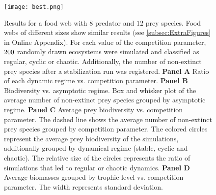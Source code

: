 \begin{figure}
	\begin{center}
		\texttt{[image: best.png]}
	\end{center}
	\caption{Results for a food web with $8$ predator and $12$ prey species. Food webs of different sizes show similar results (see \ref{subsec:ExtraFigures} in Online Appendix). For each value of the competition parameter, $200$ randomly drawn ecosystems were simulated and classified as regular, cyclic or chaotic. Additionally, the number of non-extinct prey species after a stabilization run was registered. \textbf{Panel A} Ratio of each dynamic regime vs. competition parameter. \textbf{Panel B} Biodiversity vs. asymptotic regime. Box and whisker plot of the average number of non-extinct prey species grouped by asymptotic regime. \textbf{Panel C} Average prey biodiversity vs. competition parameter. The dashed line shows the average number of non-extinct prey species grouped by competition parameter. The colored circles represent the average prey biodiversity of the simulations, additionally grouped by dynamical regime (stable, cyclic and chaotic). The relative size of the circles represents the ratio of simulations that led to regular or chaotic dynamics. \textbf{Panel D} Average biomasses grouped by trophic level vs. competition parameter. The width represents standard deviation.}
	\label{fig:Biodiversity}
\end{figure}